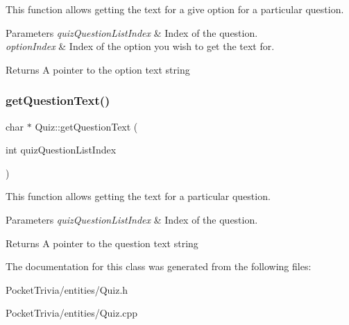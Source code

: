 This function allows getting the text for a give option for a particular question. 


\begin{DoxyParams}{Parameters}
{\em quiz\+Question\+List\+Index} & Index of the question. \\
\hline
{\em option\+Index} & Index of the option you wish to get the text for.\\
\hline
\end{DoxyParams}
\begin{DoxyReturn}{Returns}
A pointer to the option text string 
\end{DoxyReturn}
\mbox{\label{class_quiz_a2e4f114860239291825a0b7fc8b97316}} 
\subsubsection{\texorpdfstring{getQuestionText()}{getQuestionText()}}
{\footnotesize\ttfamily char $\ast$ Quiz\+::get\+Question\+Text (\begin{DoxyParamCaption}\item[{int}]{quiz\+Question\+List\+Index }\end{DoxyParamCaption})}



This function allows getting the text for a particular question. 


\begin{DoxyParams}{Parameters}
{\em quiz\+Question\+List\+Index} & Index of the question. \\
\hline
\end{DoxyParams}
\begin{DoxyReturn}{Returns}
A pointer to the question text string 
\end{DoxyReturn}


The documentation for this class was generated from the following files\+:\begin{DoxyCompactItemize}
\item 
Pocket\+Trivia/entities/Quiz.\+h\item 
Pocket\+Trivia/entities/Quiz.\+cpp\end{DoxyCompactItemize}
